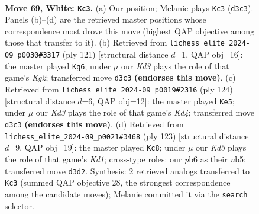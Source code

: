 \documentclass[11pt]{article}
\begin{document}
\clearpage

\begin{figure}[p]\centering
\begin{subfigure}{0.46\textwidth}\centering
\resizebox{\linewidth}{!}{%
\newchessgame
\chessboard[
  setfen={8/8/pp6/8/q1P4k/3K4/8/8 w - - 6 69},
  showmover=false,
  pgfstyle=straightmove, color=movearrow, markmove={d3-c3}
]}
\caption{}
\end{subfigure}\hfill
\begin{subfigure}{0.46\textwidth}\centering
\resizebox{\linewidth}{!}{%
\newchessgame
\chessboard[
  setfen={8/6k1/4Qp2/8/5PP1/8/6K1/8 b - - 1 61},
  showmover=false,
  pgfstyle=straightmove, color=movearrow, markmove={g7-g6}
]}
\caption{}
\end{subfigure}
\\[4pt]
\begin{subfigure}{0.46\textwidth}\centering
\resizebox{\linewidth}{!}{%
\newchessgame
\chessboard[
  setfen={6k1/5p2/2q4p/2P5/3K4/8/8/8 w - - 1 63},
  showmover=false,
  pgfstyle=straightmove, color=movearrow, markmove={d4-e5}
]}
\caption{}
\end{subfigure}\hfill
\begin{subfigure}{0.46\textwidth}\centering
\resizebox{\linewidth}{!}{%
\newchessgame
\chessboard[
  setfen={3k4/5Q2/8/1N5p/7P/5K2/8/8 b - - 8 62},
  showmover=false,
  pgfstyle=straightmove, color=movearrow, markmove={d8-c8}
]}
\caption{}
\end{subfigure}
\caption{\textbf{Move 69, White: \texttt{Kc3}.} (a) Our position; Melanie plays \texttt{Kc3} (\texttt{d3c3}). Panels (b)--(d) are the retrieved master positions whose correspondence most drove this move (highest QAP objective among those that transfer to it). (b) Retrieved from \texttt{lichess\_elite\_2024-09\_p0030\#3317} (ply 121) [structural distance $d$=1, QAP obj=16]: the master played \texttt{Kg6}; under $\mu$ our \emph{Kd3} plays the role of that game's \emph{Kg2}; transferred move \texttt{d3c3} \textbf{(endorses this move)}. (c) Retrieved from \texttt{lichess\_elite\_2024-09\_p0019\#2316} (ply 124) [structural distance $d$=6, QAP obj=12]: the master played \texttt{Ke5}; under $\mu$ our \emph{Kd3} plays the role of that game's \emph{Kd4}; transferred move \texttt{d3c3} \textbf{(endorses this move)}. (d) Retrieved from \texttt{lichess\_elite\_2024-09\_p0021\#3468} (ply 123) [structural distance $d$=9, QAP obj=19]: the master played \texttt{Kc8}; under $\mu$ our \emph{Kd3} plays the role of that game's \emph{Kd1}; cross-type roles: our \emph{p}b6 as their \emph{n}b5; transferred move \texttt{d3d2}. Synthesis: 2 retrieved analogs transferred to \texttt{Kc3} (summed QAP objective 28, the strongest correspondence among the candidate moves); Melanie committed it via the \texttt{search} selector.}
\label{fig:thought-m136}
\end{figure}
\end{document}
